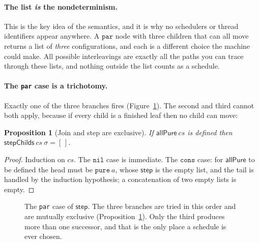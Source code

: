 \documentclass[11pt,a4paper]{article}
\theoremstyle{definition}
\theoremstyle{plain}
\newtheorem{proposition}[definition]{Proposition}
\theoremstyle{remark}
\newcommand{\st}{\sigma}
\begin{document}
\paragraph{The list \emph{is} the nondeterminism.}
This is the key idea of the semantics, and it is why no schedulers or thread identifiers
appear anywhere. A $\texttt{par}$ node with three children that can all move returns a list
of \emph{three} configurations, and each is a different choice the machine could make. All
possible interleavings are exactly all the paths you can trace through these lists, and
nothing outside the list counts as a schedule.

\paragraph{The \texttt{par} case is a trichotomy.}
Exactly one of the three branches fires (Figure~\ref{fig:trichotomy}). The second and third
cannot both apply, because if every child is a finished leaf then no child can move:

\begin{proposition}[Join and step are exclusive]\label{prop:joinexcl}
If $\mathsf{allPure}\ cs$ is defined then $\mathsf{stepChilds}\ cs\ \st = [\,]$.
\end{proposition}

\begin{proof}
Induction on $cs$. The $\texttt{nil}$ case is immediate. The $\texttt{cons}$ case: for
$\mathsf{allPure}$ to be defined the head must be $\texttt{pure}\ a$, whose $\mathsf{step}$
is the empty list, and the tail is handled by the induction hypothesis; a concatenation of
two empty lists is empty.
\end{proof}

\begin{figure}[htb]
\centering
{}
\caption{The \texttt{par} case of $\mathsf{step}$. The three branches are tried in this
order and are mutually exclusive (Proposition~\ref{prop:joinexcl}). Only the third produces
more than one successor, and that is the only place a schedule is ever
chosen.}\label{fig:trichotomy}
\end{figure}
\end{document}
